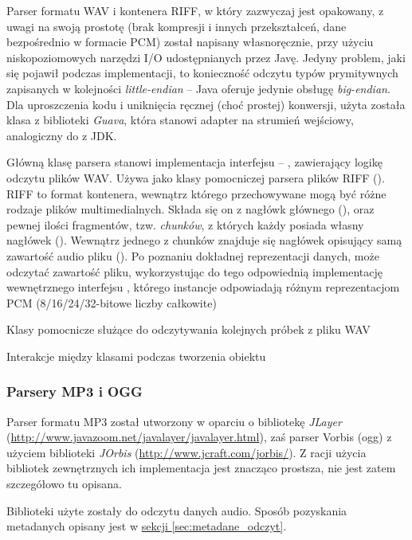 Parser formatu WAV i kontenera RIFF, w który zazwyczaj jest opakowany, z uwagi na swoją prostotę
(brak kompresji i innych przekształceń, dane bezpośrednio w formacie PCM) został napisany
własnoręcznie, przy użyciu niskopoziomowych narzędzi I/O udostępnianych przez Javę. Jedyny problem,
jaki się pojawił podczas implementacji, to konieczność odczytu typów prymitywnych zapisanych w
kolejności \textit{little-endian} -- Java oferuje jedynie obsługę \textit{big-endian}. Dla
uproszczenia kodu i uniknięcia ręcznej (choć prostej) konwersji, użyta została klasa
 z biblioteki \emph{Guava}, która stanowi adapter na strumień
wejściowy, analogiczny do  z JDK.


Główną klasę parsera stanowi implementacja interfejsu  -- ,
zawierający logikę odczytu plików WAV. Używa jako klasy pomocniczej parsera plików RIFF
(). RIFF to format kontenera, wewnątrz którego przechowywane mogą być różne rodzaje
plików multimedialnych. Składa się on z nagłówk głównego (), oraz pewnej ilości
fragmentów, tzw. \textit{chunków}, z których każdy posiada własny nagłówek ().
Wewnątrz jednego z chunków znajduje się nagłówek opisujący samą zawartość audio pliku
(). Po poznaniu dokładnej reprezentacji danych,  może odczytać
zawartość pliku, wykorzystując do tego odpowiednią implementację wewnętrznego interfejsu
, którego instancje odpowiadają różnym reprezentacjom PCM (8/16/24/32-bitowe liczby
całkowite)

{Klasy pomocnicze służące do odczytywania kolejnych próbek z pliku WAV}

{Interakcje między klasami podczas tworzenia obiektu }


\subsubsection{Parsery MP3 i OGG}

Parser formatu MP3 został utworzony w oparciu o bibliotekę
\emph{JLayer} (\url{http://www.javazoom.net/javalayer/javalayer.html}), zaś parser Vorbis (ogg) z
użyciem biblioteki \emph{JOrbis} (\url{http://www.jcraft.com/jorbis/}). Z racji użycia bibliotek
zewnętrznych ich implementacja jest znacząco prostsza, nie jest zatem szczegółowo tu opisana.

Biblioteki użyte zostały do odczytu danych audio. Sposób pozyskania metadanych opisany jest w
\hyperref[sec:metadane_odczyt]{sekcji \ref*{sec:metadane_odczyt}}.



